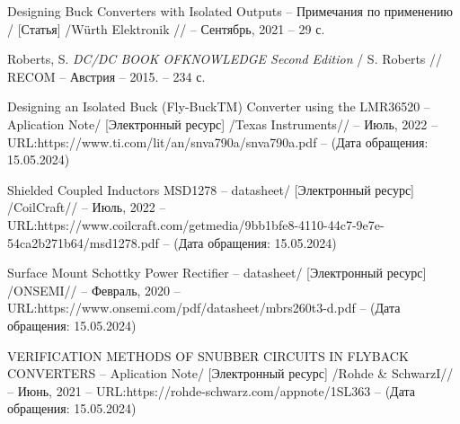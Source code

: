\begin{thebibliography}{00}
Designing Buck Converters with Isolated Outputs 
-- Примечания по применению /
[Статья] /Würth Elektronik // -- Сентябрь, 2021 -- 29 с.

 Roberts, S.
\emph{DC/DC BOOK OFKNOWLEDGE Second Edition} / S. Roberts // RECOM --
Австрия -- 2015. -- 234 с.

 Designing an Isolated Buck (Fly-BuckTM) Converter using
the LMR36520
  -- Aplication Note/
  [Электронный ресурс] /Texas Instruments// -- Июль, 2022 -- 
  URL:https://www.ti.com/lit/an/snva790a/snva790a.pdf
  -- (Дата обращения: 15.05.2024)


 Shielded Coupled Inductors MSD1278
-- datasheet/
[Электронный ресурс] /CoilCraft// -- Июль, 2022 -- 
URL:https://www.coilcraft.com/getmedia/9bb1bfe8-4110-44c7-9e7e-54ca2b271b64/msd1278.pdf
-- (Дата обращения: 15.05.2024)

 Surface Mount Schottky Power Rectifier
-- datasheet/
[Электронный ресурс] /ONSEMI// -- Февраль, 2020 -- 
URL:https://www.onsemi.com/pdf/datasheet/mbrs260t3-d.pdf
-- (Дата обращения: 15.05.2024)

 VERIFICATION METHODS OF SNUBBER CIRCUITS IN FLYBACK
CONVERTERS
-- Aplication Note/
[Электронный ресурс] /Rohde \& SchwarzI// -- Июнь, 2021 -- 
URL:https://rohde-schwarz.com/appnote/1SL363
-- (Дата обращения: 15.05.2024)


\end{thebibliography}
